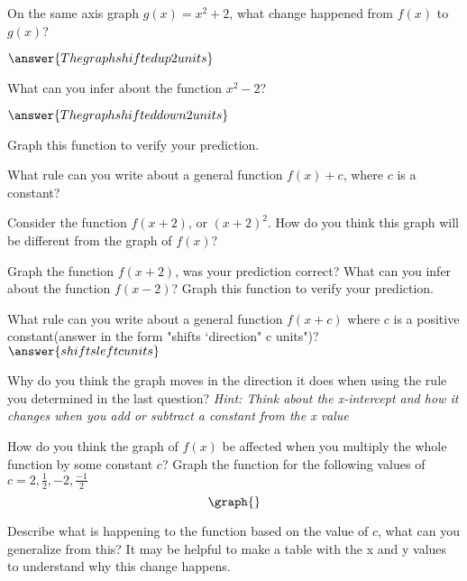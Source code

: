 \documentclass{ximera}
\begin{document}
\begin{question}

On the same axis graph $g(x)=x^2+2$, what change happened from $f(x)$ to $g(x)$?

$\answer{The graph shifted up 2 units}$

What can you infer about the function $x^2-2$?

$\answer{The graph shifted down 2 units}$

Graph this function to verify your prediction.

What rule can you write about a general function $f(x)+c$, where $c$ is a constant?
\begin{freeResponse}
\end{freeResponse}
Consider the function $f(x+2)$, or $(x+2)^2$. How do you think this graph will be different from the graph of $f(x)$?
\begin{freeResponse}
\end{freeResponse}
Graph the function $f(x+2)$, was your prediction correct? What can you infer about the function $f(x-2)$? Graph this function to verify your prediction.
\begin{freeResponse}
\end{freeResponse}
What rule can you write about a general function $f(x+c)$ where $c$ is a positive constant(answer in the form "shifts `direction" c units")?
$\answer{shifts left c units}$

Why do you think the graph moves in the direction it does when using the rule you determined in the last question? \textit{Hint: Think about the x-intercept and how it changes when you add or subtract a constant from the x value}
\begin{freeResponse}
\end{freeResponse}
How do you think the graph of $f(x)$ be affected when you multiply the whole function by some constant $c$? Graph the function for the following values of $c=2,\frac{1}{2},-2,\frac{-1}{2}$
\[
\graph{}
\]
\begin{freeResponse}
\end{freeResponse}
Describe what is happening to the function based on the value of $c$, what can you generalize from this? It may be helpful to make a table with the x and y values to understand why this change happens.
\begin{freeResponse}
\end{freeResponse}
\end{question}
\end{document}
